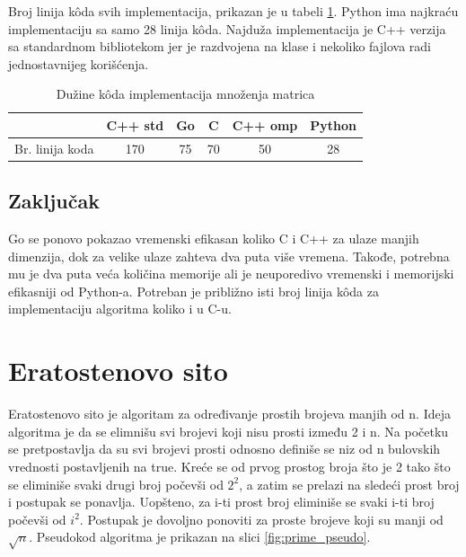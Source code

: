 \documentclass[12pt,oneside]{memoir}
\begin{document}
Broj linija k\^{o}da svih  implementacija, prikazan je u tabeli \ref{tab:matrix2}. Python ima najkraću implementaciju sa samo 28 linija k\^{o}da. Najduža implementacija je C++ verzija sa standardnom bibliotekom jer je razdvojena na klase i nekoliko fajlova radi jednostavnijeg korišćenja.  

\begin{table}
\begin{center}
\caption{Dužine k\^{o}da implementacija množenja matrica}
\begin{tabular}{|c|c|c|c|c|c|}
\hline
		& C++ std	&  Go 	& C	& C++ omp	& Python	\\ \hline
Br. linija koda&170		& 75	& 70	&50		&28		\\ \hline
\end{tabular}
\label{tab:matrix2}
\end{center}
\end{table}

\subsection{Zaključak}

Go se ponovo pokazao vremenski efikasan koliko C i C++ za ulaze manjih dimenzija, dok za velike ulaze zahteva dva puta više vremena. Takođe, potrebna mu je dva puta veća količina memorije ali je neuporedivo vremenski i memorijski efikasniji od Python-a. Potreban je približno isti broj linija k\^{o}da za implementaciju algoritma koliko i u C-u.



\section{Eratostenovo sito}
Eratostenovo sito je algoritam za određivanje prostih brojeva manjih od n. Ideja algoritma je da se elimnišu svi brojevi koji nisu prosti između 2 i n. Na početku se pretpostavlja da su svi brojevi prosti odnosno definiše se niz od n bulovskih vrednosti postavljenih na true. Kreće se od prvog prostog broja što je 2 tako što se eliminiše svaki drugi broj počevši od $2^{2}$, a zatim se prelazi na sledeći prost broj i postupak se ponavlja. Uopšteno, za i-ti prost broj eliminiše se svaki i-ti broj počevši od  $i^{2}$. Postupak je dovoljno ponoviti za proste brojeve koji su manji od $\sqrt{n}$. Pseudokod algoritma je prikazan na slici \ref{fig:prime_pseudo}.
\end{document}
